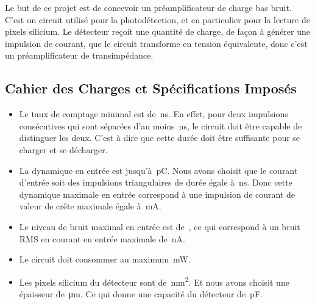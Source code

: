 \documentclass[a4paper,12pt]{article}
\numberwithin{equation}{section}
\newcommand{\?}{\stackrel{?}{=}}
\newcommand{\sis}[2]{\complexnum{#1}\,\si[per-mode=symbol]{#2}}
\begin{document}
Le but de ce projet est de concevoir un préamplificateur de charge bas bruit. C'est un circuit utilisé pour la photodétection, et en particulier pour la lecture de pixels silicium. Le détecteur reçoit une quantité de charge, de façon à générer une impulsion de courant, que le circuit transforme en tension équivalente, donc c'est un préamplificateur de transimpédance.

\subsection{Cahier des Charges et Spécifications Imposés}

\begin{itemize}
    \item Le taux de comptage minimal est de \sis{50}{\nano\second}. En effet, pour deux impulsions consécutives qui sont séparées d'au moins \sis{50}{\nano\second}, le circuit doit être capable de distinguer les deux. C'est à dire que cette durée doit être suffisante pour se charger et se décharger. 

    \item La dynamique en entrée est jusqu'à \sis{1}{\pico\coulomb}. Nous avons choisit que le courant d'entrée soit des impulsions triangulaires de durée égale à \sis{2}{\nano\second}. Donc cette dynamique maximale en entrée correspond à une impulsion de courant de valeur de crête maximale égale à \sis{1}{\milli\ampere}.

    \item Le niveau de bruit maximal en entrée est de \sis{1000}{\electron}, ce qui correspond à un bruit RMS en courant en entrée maximale de \sis{160.22}{\nano\ampere}.

    \item Le circuit doit consommer au maximum \sis{2}{\milli\watt}.

    \item Les pixels silicium du détecteur sont de \sis{20}{\milli\meter\squared}. Et nous avons choisit une épaisseur de \sis{470}{\micro\meter}. Ce qui donne une capacité du détecteur de \sis{4.5}{\pico\farad}. 


\end{itemize}
\end{document}
